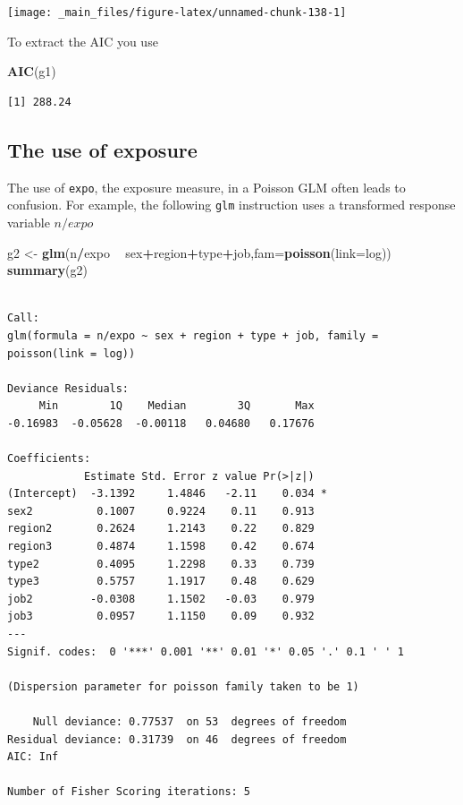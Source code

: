 \documentclass[
]{book}
\newenvironment{Shaded}{\begin{snugshade}}{\end{snugshade}}
\newcommand{\DataTypeTok}[1]{\textcolor[rgb]{0.13,0.29,0.53}{#1}}
\newcommand{\KeywordTok}[1]{\textcolor[rgb]{0.13,0.29,0.53}{\textbf{#1}}}
\newcommand{\NormalTok}[1]{#1}
\newcommand{\OperatorTok}[1]{\textcolor[rgb]{0.81,0.36,0.00}{\textbf{#1}}}
\newcommand{\StringTok}[1]{\textcolor[rgb]{0.31,0.60,0.02}{#1}}
\begin{document}
\begin{center}\texttt{[image: \_main\_files/figure-latex/unnamed-chunk-138-1]} \end{center}

To extract the AIC you use

\begin{Shaded}
\begin{Highlighting}[]
\KeywordTok{AIC}\NormalTok{(g1)}
\end{Highlighting}
\end{Shaded}

\begin{verbatim}
[1] 288.24
\end{verbatim}

\hypertarget{the-use-of-exposure}{%
\subsection{The use of exposure}\label{the-use-of-exposure}}

The use of \texttt{expo}, the exposure measure, in a Poisson GLM often leads to confusion. For example, the following \texttt{glm} instruction uses a transformed response variable \(n/expo\)

\begin{Shaded}
\begin{Highlighting}[]
\NormalTok{g2 <-}\StringTok{ }\KeywordTok{glm}\NormalTok{(n}\OperatorTok{/}\NormalTok{expo }\OperatorTok{~}\StringTok{ }\NormalTok{sex}\OperatorTok{+}\NormalTok{region}\OperatorTok{+}\NormalTok{type}\OperatorTok{+}\NormalTok{job,}\DataTypeTok{fam=}\KeywordTok{poisson}\NormalTok{(}\DataTypeTok{link=}\NormalTok{log))}
\KeywordTok{summary}\NormalTok{(g2)}
\end{Highlighting}
\end{Shaded}

\begin{verbatim}

Call:
glm(formula = n/expo ~ sex + region + type + job, family = poisson(link = log))

Deviance Residuals: 
     Min        1Q    Median        3Q       Max  
-0.16983  -0.05628  -0.00118   0.04680   0.17676  

Coefficients:
            Estimate Std. Error z value Pr(>|z|)  
(Intercept)  -3.1392     1.4846   -2.11    0.034 *
sex2          0.1007     0.9224    0.11    0.913  
region2       0.2624     1.2143    0.22    0.829  
region3       0.4874     1.1598    0.42    0.674  
type2         0.4095     1.2298    0.33    0.739  
type3         0.5757     1.1917    0.48    0.629  
job2         -0.0308     1.1502   -0.03    0.979  
job3          0.0957     1.1150    0.09    0.932  
---
Signif. codes:  0 '***' 0.001 '**' 0.01 '*' 0.05 '.' 0.1 ' ' 1

(Dispersion parameter for poisson family taken to be 1)

    Null deviance: 0.77537  on 53  degrees of freedom
Residual deviance: 0.31739  on 46  degrees of freedom
AIC: Inf

Number of Fisher Scoring iterations: 5
\end{verbatim}
\end{document}
